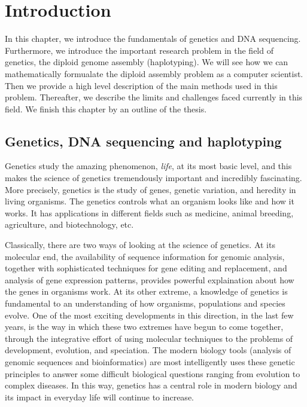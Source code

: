 \chapter{Introduction}

In this chapter, we introduce the fundamentals of genetics and DNA sequencing. Furthermore, we introduce the important research problem in the field of genetics, the diploid genome assembly (haplotyping). 
We will see how we can mathematically formualate the diploid assembly problem as a computer scientist.
Then we provide a high level description of the main methods used in this problem.
Thereafter, we describe the limits and challenges faced currently in this field. We finish this chapter by an outline of the thesis.

\section{Genetics, DNA sequencing and haplotyping}
Genetics study the amazing phenomenon, \textit{life}, at its most basic level, and this makes the science of genetics tremendously important and incredibly fascinating.
More precisely, genetics is the study of genes, genetic variation, and heredity in living organisms. The genetics controls what an organism looks like and how it works. 
It has applications in different fields such as medicine, animal breeding, agriculture, and biotechnology, etc.

Classically, there are two ways of looking at the science of genetics.
At its molecular end, the availability of sequence information for genomic analysis, together with sophisticated techniques for gene editing and replacement, 
and analysis of gene expression patterns, provides powerful explaination about how the genes in organisms work. 
At its other extreme, a knowledge of genetics is fundamental to an understanding of how organisms, populations and species evolve. 
One of the most exciting developments in this direction, in the last few years, is the way in which these two extremes have begun to come together, 
through the integrative effort of using molecular techniques to the problems of development, evolution, and speciation.
The modern biology tools (analysis of genomic sequences and bioinformatics) are most intelligently uses these genetic principles to answer some difficult biological questions ranging from evolution to complex diseases.
In this way, genetics has a central role in modern biology and its impact in everyday life will continue to increase.

